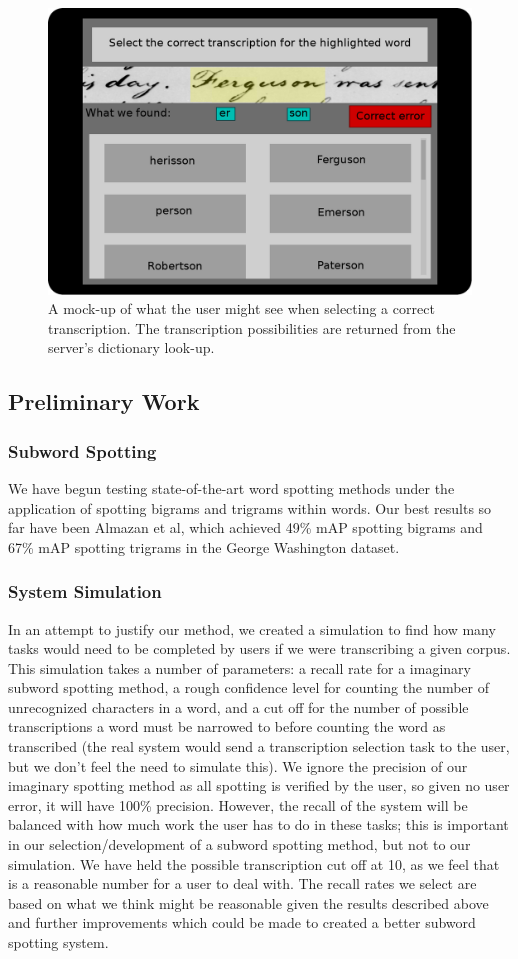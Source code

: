 \documentclass[ms]{byuprop}
\begin{document}
\begin{figure}[h]
    \centering
    \includegraphics[width=.6\textwidth]{userTask_trans}
    \caption{A mock-up of what the user might see when selecting a correct transcription. The transcription possibilities are returned from the server's dictionary look-up.}
    \label{fig:userTask_trans}
\end{figure}

\subsection{Preliminary Work}

\subsubsection{Subword Spotting}
We have begun testing state-of-the-art word spotting methods under the application of spotting bigrams and trigrams within words. Our best results so far have been Almazan et al\cite{Almazan2014}, which achieved 49\% mAP spotting bigrams and 67\% mAP spotting trigrams in the George Washington dataset.

\subsubsection{System Simulation}
In an attempt to justify our method, we created a simulation to find how many tasks would need to be completed by users if we were transcribing a given corpus. This simulation takes a number of parameters: a recall rate for a imaginary subword spotting method, a rough confidence level for counting the number of unrecognized characters in a word, and a cut off for the number of possible transcriptions a word must be narrowed to before counting the word as transcribed (the real system would send a transcription selection task to the user, but we don't feel the need to simulate this). We ignore the precision of our imaginary spotting method as all spotting is verified by the user, so given no user error, it will have 100\% precision. However, the recall of the system will be balanced with how much work the user has to do in these tasks; this is important in our selection/development of a subword spotting method, but not to our simulation. We have held the possible transcription cut off at 10, as we feel that is a reasonable number for a user to deal with. The recall rates we select are based on what we think might be reasonable given the  results described above and further improvements which could be made to created a better subword spotting system.
\end{document}
